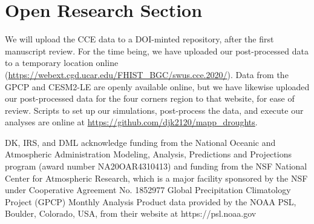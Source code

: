 \documentclass[draft]{agujournal2019}
\begin{document}
\clearpage


%
%

\section*{Open Research Section}
We will upload the CCE data to a DOI-minted repository, after the first manuscript review. 
For the time being, we have uploaded our post-processed data to a temporary location online (\url{https://webext.cgd.ucar.edu/FHIST_BGC/swus.cce.2020/}).
Data from the GPCP and CESM2-LE are openly available online, but we have likewise uploaded our post-processed data for the four corners region to that website, for ease of review.
Scripts to set up our simulations, post-process the data, and execute our analyses are online at \url{https://github.com/djk2120/mapp_droughts}.




\acknowledgments
DK, IRS, and DML acknowledge funding from the National Oceanic and Atmospheric Administration Modeling, Analysis, Predictions and Projections program (award number NA20OAR4310413) and funding from the NSF National Center for Atmospheric Research, which is a major facility sponsored by the NSF under Cooperative Agreement No. 1852977
Global Precipitation Climatology Project (GPCP) Monthly Analysis Product data provided by the NOAA PSL, Boulder, Colorado, USA, from their website at https://psl.noaa.gov 



%
%


\end{document}
